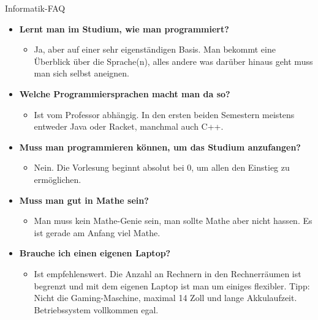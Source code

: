 \begin{LARGE}
	Informatik-FAQ
\end{LARGE}
\begin{large}
	\begin{itemize}
		\item \textbf{Lernt man im Studium, wie man programmiert?}
		\begin{itemize}
			\item Ja, aber auf einer sehr eigenständigen Basis. Man bekommt eine Überblick über die Sprache(n), alles andere was darüber hinaus geht muss man sich selbst aneignen.
		\end{itemize}
	\end{itemize}
	
	\begin{itemize}
		\item \textbf{Welche Programmiersprachen macht man da so?}
		\begin{itemize}
			\item Ist vom Professor abhängig. In den ersten beiden Semestern meistens entweder Java oder Racket, manchmal auch C++.
		\end{itemize}
	\end{itemize}
	
	\begin{itemize}
		\item \textbf{Muss man programmieren können, um das Studium anzufangen?}
		\begin{itemize}
			\item Nein. Die Vorlesung beginnt absolut bei 0, um allen den Einstieg zu ermöglichen.
		\end{itemize}
	\end{itemize}
	
	\begin{itemize}
		\item \textbf{Muss man gut in Mathe sein?}
		\begin{itemize}
			\item Man muss kein Mathe-Genie sein, man sollte Mathe aber nicht hassen. Es ist gerade am Anfang viel Mathe.
		\end{itemize}
	\end{itemize}
	
	\begin{itemize}
		\item \textbf{Brauche ich einen eigenen Laptop?}
		\begin{itemize}
			\item Ist empfehlenswert. Die Anzahl an Rechnern in den Rechnerräumen ist begrenzt und mit dem eigenen Laptop ist man um einiges flexibler. Tipp: Nicht die Gaming-Maschine, maximal 14 Zoll und lange Akkulaufzeit. Betriebssystem vollkommen egal.
		\end{itemize}
	\end{itemize}
	

\end{large}
